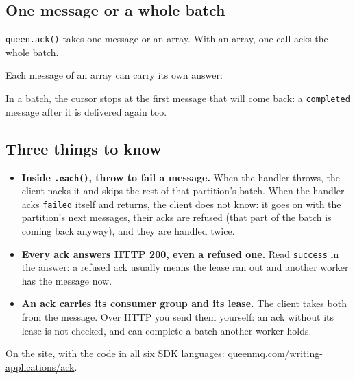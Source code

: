 \subsection{One message or a whole batch}

\texttt{queen.ack()} takes one message or an array. With an array, one call acks the whole batch.


Each message of an array can carry its own answer:


In a batch, the cursor stops at the first message that will come back: a \texttt{completed}
message after it is delivered again too.



\subsection{Three things to know}

\begin{itemize}
\item \textbf{Inside \texttt{.each()}, throw to fail a message.} When the handler throws, the client
nacks it and skips the rest of that partition's batch. When the handler acks \texttt{failed} itself
and returns, the client does not know: it goes on with the partition's next messages, their acks are
refused (that part of the batch is coming back anyway), and they are handled twice.
\item \textbf{Every ack answers HTTP 200, even a refused one.} Read \texttt{success} in the answer: a
refused ack usually means the lease ran out and another worker has the message now.
\item \textbf{An ack carries its consumer group and its lease.} The client takes both from the
message. Over HTTP you send them yourself: an ack without its lease is not checked, and can complete
a batch another worker holds.
\end{itemize}

On the site, with the code in all six SDK languages: \href{https://queenmq.com/writing-applications/ack/}{queenmq.com/writing-applications/ack}.
